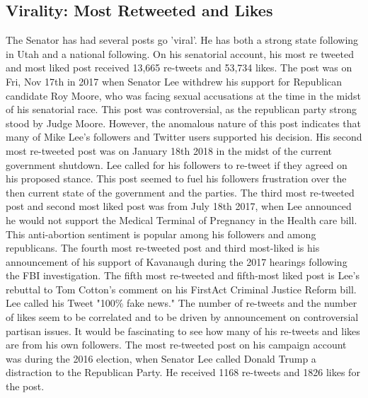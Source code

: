 \documentclass{article}
\begin{document}
\subsection{Virality: Most Retweeted and Likes}
\begin{flushleft} 
The Senator has had several posts go 'viral'. He has both a strong state following in Utah and a national following. On his senatorial account, his most re tweeted and most liked post received 13,665 re-tweets and 53,734 likes. The post was on Fri, Nov 17th in 2017 when Senator Lee withdrew his support for Republican candidate Roy Moore, who was facing sexual accusations at the time in the midst of his senatorial race. This post was controversial, as the republican party strong stood by Judge Moore. However, the anomalous nature of this post indicates that many of Mike Lee's followers and Twitter users supported his decision. His second most re-tweeted post was on January 18th 2018 in the midst of the current government shutdown. Lee called for his followers to re-tweet if they agreed on his proposed stance. This post seemed to fuel his followers frustration over the then current state of the government and the parties. The third most re-tweeted post and second most liked post was from July 18th 2017, when Lee announced he would not support the Medical Terminal of Pregnancy in the Health care bill. This anti-abortion sentiment is popular among his followers and among republicans. The fourth most re-tweeted post and third most-liked is his announcement of his support of Kavanaugh during the 2017 hearings following the FBI investigation. The fifth most re-tweeted and fifth-most liked post is Lee's rebuttal to Tom Cotton's comment on his FirstAct Criminal Justice Reform bill. Lee called his Tweet "100\% fake news." The number of re-tweets and the number of likes seem to be correlated and to be driven by announcement on controversial partisan issues. It would be fascinating to see how many of his re-tweets and likes are from his own followers. The most re-tweeted post on his campaign account was during the 2016 election, when Senator Lee called Donald Trump a distraction to the Republican Party. He received 1168 re-tweets and 1826 likes for the post. 
\end{flushleft}
\end{document}
